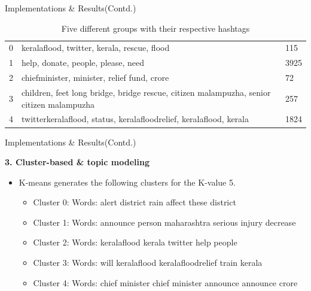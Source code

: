 \documentclass[10pt]{beamer}
\begin{document}
\begin{frame}[fragile]{ Implementations \& Results(Contd.)}


\begin{table}[!htbp]
\centering
\begin{tabular}{|p{0.5cm}|p{4.5cm}| p{1cm}| } 
 \hline
0 & keralaflood, twitter, kerala, rescue, flood & 115 \\

 1 &  help, donate, people, please, need & 3925\\ 

 2 &chiefminister, minister, relief fund, crore & 72\\

  3 & children, feet long bridge, bridge rescue, citizen malampuzha, senior citizen malampuzha & 257\\ 

   4 & twitterkeralaflood, status, keralafloodrelief, keralaflood, kerala & 1824\\ 
 \hline
\end{tabular}
\label{tid}
\caption{\label{Kmeans}Five different groups with their respective hashtags}
\end{table}




\end{frame}


\begin{frame}[fragile]{ Implementations \& Results(Contd.)}

\textbf{3. Cluster-based \& topic modeling}

\begin{itemize}
\item K-means generates the following clusters for the K-value
5.
\begin{itemize}
\item Cluster 0: Words: alert district rain affect 
these district 
\item  Cluster 1: Words: announce person maharashtra serious
injury decrease
\item Cluster 2: Words: keralaflood kerala twitter help people
\item Cluster 3: Words: will keralaflood keralafloodrelief train
kerala
\item Cluster 4: Words: chief minister chief minister announce
announce crore
\end{itemize}

\end{itemize}




\end{frame}
\end{document}
